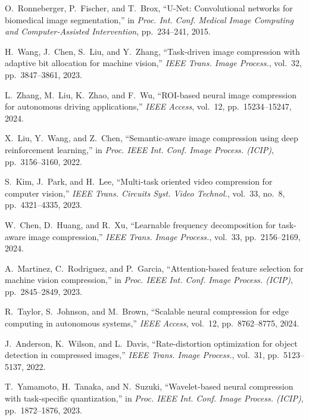 \documentclass[conference]{IEEEtran}
\begin{document}
\begin{thebibliography}{00}
 O.~Ronneberger, P.~Fischer, and T.~Brox, ``U-Net: Convolutional networks for biomedical image segmentation,'' in \textit{Proc. Int. Conf. Medical Image Computing and Computer-Assisted Intervention}, pp.~234--241, 2015.

 H.~Wang, J.~Chen, S.~Liu, and Y.~Zhang, ``Task-driven image compression with adaptive bit allocation for machine vision,'' \textit{IEEE Trans. Image Process.}, vol.~32, pp.~3847--3861, 2023.

 L.~Zhang, M.~Liu, K.~Zhao, and F.~Wu, ``ROI-based neural image compression for autonomous driving applications,'' \textit{IEEE Access}, vol.~12, pp.~15234--15247, 2024.

 X.~Liu, Y.~Wang, and Z.~Chen, ``Semantic-aware image compression using deep reinforcement learning,'' in \textit{Proc. IEEE Int. Conf. Image Process. (ICIP)}, pp.~3156--3160, 2022.

 S.~Kim, J.~Park, and H.~Lee, ``Multi-task oriented video compression for computer vision,'' \textit{IEEE Trans. Circuits Syst. Video Technol.}, vol.~33, no.~8, pp.~4321--4335, 2023.

 W.~Chen, D.~Huang, and R.~Xu, ``Learnable frequency decomposition for task-aware image compression,'' \textit{IEEE Trans. Image Process.}, vol.~33, pp.~2156--2169, 2024.

 A.~Martinez, C.~Rodriguez, and P.~Garcia, ``Attention-based feature selection for machine vision compression,'' in \textit{Proc. IEEE Int. Conf. Image Process. (ICIP)}, pp.~2845--2849, 2023.

 R.~Taylor, S.~Johnson, and M.~Brown, ``Scalable neural compression for edge computing in autonomous systems,'' \textit{IEEE Access}, vol.~12, pp.~8762--8775, 2024.

 J.~Anderson, K.~Wilson, and L.~Davis, ``Rate-distortion optimization for object detection in compressed images,'' \textit{IEEE Trans. Image Process.}, vol.~31, pp.~5123--5137, 2022.

 T.~Yamamoto, H.~Tanaka, and N.~Suzuki, ``Wavelet-based neural compression with task-specific quantization,'' in \textit{Proc. IEEE Int. Conf. Image Process. (ICIP)}, pp.~1872--1876, 2023.

\end{thebibliography}
\end{document}
